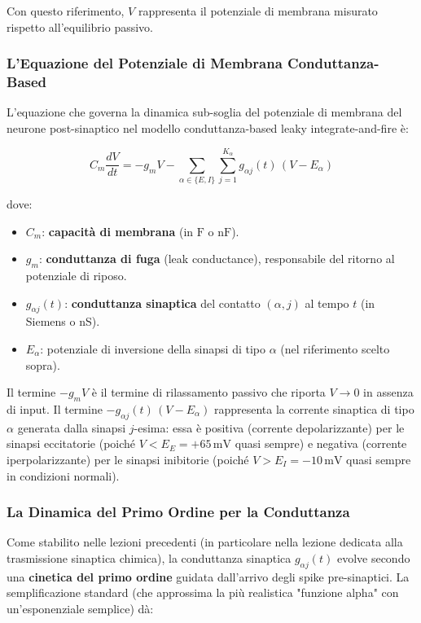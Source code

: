 Con questo riferimento, $V$ rappresenta il potenziale di membrana misurato rispetto all'equilibrio passivo.

\subsubsection{L'Equazione del Potenziale di Membrana Conduttanza-Based}

L'equazione che governa la dinamica sub-soglia del potenziale di membrana del neurone post-sinaptico nel modello conduttanza-based leaky integrate-and-fire è:

\begin{equation}
C_m \frac{dV}{dt} = -g_m V - \sum_{\alpha \in \{E,I\}} \sum_{j=1}^{K_\alpha} g_{\alpha j}(t)\,(V - E_\alpha)
\end{equation}

dove:
\begin{itemize}
    \item $C_m$: \textbf{capacità di membrana} (in $\text{F}$ o $\text{nF}$).
    \item $g_m$: \textbf{conduttanza di fuga} (leak conductance), responsabile del ritorno al potenziale di riposo.
    \item $g_{\alpha j}(t)$: \textbf{conduttanza sinaptica} del contatto $(\alpha, j)$ al tempo $t$ (in Siemens o nS).
    \item $E_\alpha$: potenziale di inversione della sinapsi di tipo $\alpha$ (nel riferimento scelto sopra).
\end{itemize}

Il termine $-g_m V$ è il termine di rilassamento passivo che riporta $V \to 0$ in assenza di input. Il termine $-g_{\alpha j}(t)\,(V - E_\alpha)$ rappresenta la corrente sinaptica di tipo $\alpha$ generata dalla sinapsi $j$-esima: essa è positiva (corrente depolarizzante) per le sinapsi eccitatorie (poiché $V < E_E = +65\,\text{mV}$ quasi sempre) e negativa (corrente iperpolarizzante) per le sinapsi inibitorie (poiché $V > E_I = -10\,\text{mV}$ quasi sempre in condizioni normali).



\subsubsection{La Dinamica del Primo Ordine per la Conduttanza}

Come stabilito nelle lezioni precedenti (in particolare nella lezione dedicata alla trasmissione sinaptica chimica), la conduttanza sinaptica $g_{\alpha j}(t)$ evolve secondo una \textbf{cinetica del primo ordine} guidata dall'arrivo degli spike pre-sinaptici. La semplificazione standard (che approssima la più realistica "funzione alpha" con un'esponenziale semplice) dà:

